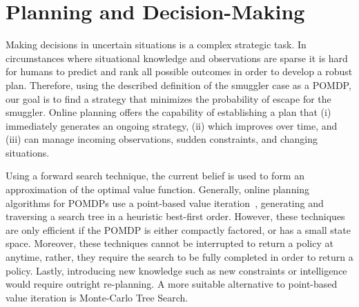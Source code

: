 \documentclass[conference]{IEEEtran}
\begin{document}

\section{Planning and Decision-Making}
\label{sec:ma-dec-mak}

Making decisions in uncertain situations is a complex strategic task. In circumstances where situational knowledge and observations are sparse it is hard for humans to predict and rank all possible outcomes in order to develop a robust plan. Therefore, using the described definition of the smuggler case as a POMDP, our goal is to find a strategy that minimizes the probability of escape for the smuggler. Online planning offers the capability of establishing a plan that (i) immediately generates an ongoing strategy, (ii) which improves over time, and (iii) can manage incoming observations, sudden constraints, and changing situations. 

Using a forward search technique, the current belief is used to form an approximation of the optimal value function. Generally, online planning algorithms for POMDPs use a point-based value iteration~\cite{pineau2006anytime,ross2008online}, generating and traversing a search tree in a heuristic best-first order. However, these techniques are only efficient if the POMDP is either compactly factored, or has a small state space. Moreover, these techniques cannot be interrupted to return a policy at anytime, rather, they require the search to be fully completed in order to return a policy. Lastly, introducing new knowledge such as new constraints or intelligence would require outright re-planning. A more suitable alternative to point-based value iteration is Monte-Carlo Tree Search.
\end{document}
